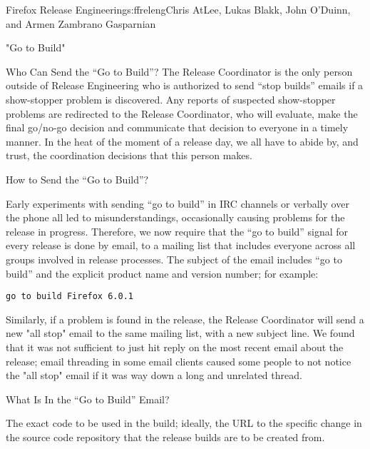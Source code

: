 \begin{aosachapter}{Firefox Release Engineering}{s:ffreleng}{Chris AtLee, Lukas Blakk, John O'Duinn, and Armen Zambrano Gasparnian}
\begin{aosasect1}{"Go to Build"}
\begin{aosasect2}{Who Can Send the ``Go to Build''?}
The Release Coordinator is the only person outside of Release
Engineering who is authorized to send ``stop builds'' emails if a
show-stopper problem is discovered. Any reports of
suspected show-stopper problems are redirected to the Release
Coordinator, who will evaluate, make the final go/no-go decision and
communicate that decision to everyone in a timely manner. In the heat 
of the moment of a release day, we all have to abide by, and trust, the 
coordination decisions that this person makes. 

\end{aosasect2}

\begin{aosasect2}{How to Send the ``Go to Build''?}

Early experiments with sending ``go to build'' in IRC channels or
verbally over the phone all led to misunderstandings,
occasionally causing problems for the release in progress. Therefore,
we now require that the ``go to build'' signal for every release is
done by email, to a mailing list that includes everyone across all
groups involved in release processes. The subject of the email
includes ``go to build'' and the explicit product name and version
number; for example:

\begin{verbatim}
go to build Firefox 6.0.1
\end{verbatim}

Similarly, if a problem is found in the release, the Release
Coordinator will send a new "all stop" email to the same mailing list,
with a new subject line. We found that it was not sufficient to just hit reply
on the most recent email about the release; email threading in some
email clients caused some people to not notice the "all stop" email if
it was way down a long and unrelated thread.

\end{aosasect2}

\begin{aosasect2}{What Is In the ``Go to Build'' Email?}

\begin{aosaenumerate}

\item The exact code to be used in the build; ideally, the URL to the
specific change in the source code repository that the release builds are
to be created from.

  \begin{aosaenumerate2}


\end{aosaenumerate2}
\end{aosaenumerate}
\end{aosasect2}
\end{aosasect1}
\end{aosachapter}
